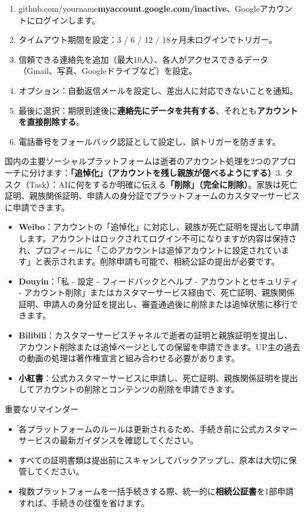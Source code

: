 \begin{enumerate}
  \item github.com/yourname\textbf{myaccount.google.com/inactive}、Googleアカウントにログインします。
  \item タイムアウト期間を設定：3 / 6 / 12 / 18ヶ月未ログインでトリガー。
  \item 信頼できる連絡先を追加（最大10人）、各人がアクセスできるデータ（Gmail、写真、Googleドライブなど）を設定。
  \item オプション：自動返信メールを設定し、差出人に対応できないことを通知。
  \item 最後に選択：期限到達後に\textbf{連絡先にデータを共有する}、それとも\textbf{アカウントを直接削除する}。
  \item 電話番号をフォールバック認証として設定し、誤トリガーを防ぎます。
\end{enumerate}


国内の主要ソーシャルプラットフォームは逝者のアカウント処理を2つのアプローチに分けます：\textbf{「追悼化」（アカウントを残し親族が偲べるようにする）}3. タスク（Task）：AIに何をするか明確に伝える\textbf{「削除」（完全に削除）}。家族は死亡証明、親族関係証明、申請人の身分証でプラットフォームのカスタマーサービスに申請できます。

\begin{itemize}
  \item \textbf{Weibo}：アカウントの「追悼化」に対応し、親族が死亡証明を提出して申請します。アカウントはロックされてログイン不可になりますが内容は保持され、プロフィールに「このアカウントは追悼アカウントに設定されています」と表示されます。削除申請も可能で、相続公証の提出が必要です。
  \item \textbf{Douyin}：「私 - 設定 - フィードバックとヘルプ - アカウントとセキュリティ - アカウント削除」またはカスタマーサービス経由で、死亡証明、親族関係証明、申請人の身分証を提出し、審査通過後に削除または追悼状態に移行できます。
  \item \textbf{Bilibili}：カスタマーサービスチャネルで逝者の証明と親族証明を提出し、アカウント削除または追悼ページとしての保留を申請できます。UP主の過去の動画の処理は著作権宣言と組み合わせる必要があります。
  \item \textbf{小紅書}：公式カスタマーサービスに申請し、死亡証明、親族関係証明を提出してアカウントの削除とコンテンツの削除を申請できます。
\end{itemize}

\begin{tcbinfo}{重要なリマインダー}
\begin{itemize}
  \item 各プラットフォームのルールは更新されるため、手続き前に公式カスタマーサービスの最新ガイダンスを確認してください。
  \item すべての証明書類は提出前にスキャンしてバックアップし、原本は大切に保管してください。
  \item 複数プラットフォームを一括手続きする際、統一的に\textbf{相続公証書}を1部申請すれば、手続きの往復を省けます。
\end{itemize}

\end{tcbinfo}

